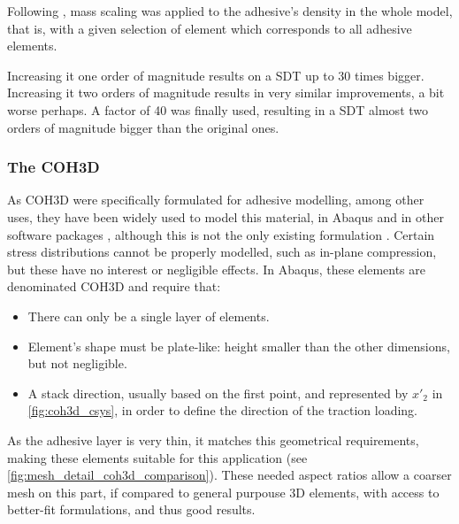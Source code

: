 \documentclass[cmfonts]{witpress}
\begin{document}
Following \cite{Scattina2011}, mass scaling was applied to the adhesive's density in the whole model, that is, with a given selection of element which corresponds to all adhesive elements.

Increasing it one order of magnitude results on a SDT up to 30 times bigger. Increasing it two orders of magnitude results in very similar improvements, a bit worse perhaps. A factor of 40 was finally used, resulting in a SDT almost two orders of magnitude bigger than the original ones.

\subsubsection{The COH3D}
\label{sec:coh_elem}

As COH3D were specifically formulated for adhesive modelling, among other uses, they have been widely used to model this material, in Abaqus \cite{Sadowski2010, Sadowski2011, Sadowski2014, Alvarez2014} and in other software packages \cite{Sato2000, Carlberger2007, Loureiro2010, Scattina2011, Ghasemnejad2013}, although this is not the only existing formulation \cite{Sato2000, Greve2007, Liao2011, Yang2012}. Certain stress distributions cannot be properly modelled, such as in-plane compression, but these have no interest or negligible effects. In Abaqus, these elements are denominated COH3D and require that:
\begin{itemize}
	\item There can only be a single layer of elements.

	\item Element's shape must be plate-like: height smaller than the other dimensions, but not negligible.

	\item A stack direction, usually based on the first point, and represented by $x'_{2}$ in \cref{fig:coh3d_csys}, in order to define the direction of the traction loading.
\end{itemize}

As the adhesive layer is very thin, it matches this geometrical requirements, making these elements suitable for this application (see \cref{fig:mesh_detail_coh3d_comparison}). These needed aspect ratios allow a coarser mesh on this part, if compared to general purpouse 3D elements, with access to better-fit formulations, and thus good results.
\end{document}
